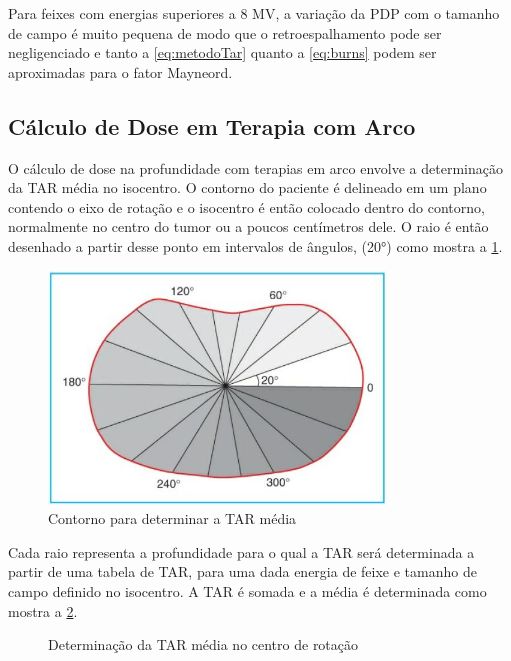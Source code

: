 \documentclass[11pt,a4paper]{article}
\begin{document}
	Para feixes com energias superiores a 8 MV, a variação da PDP com o tamanho de campo é muito pequena de modo que o retroespalhamento pode ser negligenciado e tanto a  \ref{eq:metodoTar} quanto a \ref{eq:burns} podem ser aproximadas para o fator Mayneord.

	\subsection*{Cálculo de Dose em Terapia com Arco}

	O cálculo de dose na profundidade com terapias em arco envolve a determinação da TAR média no isocentro. O contorno do paciente é delineado em um plano contendo o eixo de rotação e o isocentro é então colocado dentro do contorno, normalmente no centro do tumor ou a poucos centímetros dele. O raio é então desenhado a partir desse ponto em intervalos de ângulos, (\ang{20}) como mostra a \ref{fig:tarArco}. 

	\begin{figure}[h]
		\centering
		\includegraphics[width=0.8\textwidth]{Imagens/tarArco.JPG}
		\caption{Contorno para determinar a TAR média}
		\label{fig:tarArco}                
	\end{figure}

	Cada raio representa a profundidade para o qual a TAR será determinada a partir de uma tabela de TAR, para uma dada energia de feixe e tamanho de campo definido no isocentro. A TAR é somada e a média é determinada como mostra a \ref{fig:tabelaTarArco}.


	\begin{figure}[h]
		\centering
		\caption{Determinação da TAR média no centro de rotação}
		\label{fig:tabelaTarArco}
	  \end{figure}
\end{document}
